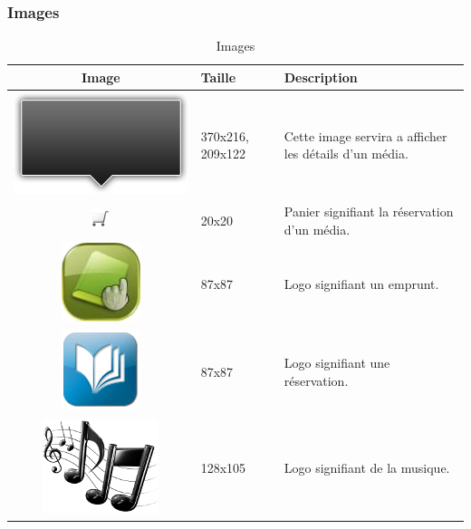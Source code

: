 \documentclass[letter, 11pt]{report}
\begin{document}
\subsubsection{Images}

\begin{table}[ht]
	\caption{Images}
	\begin{center}
		\begin{tabular}{|c|l|l|}
		\hline
		Image                                            & Taille           & Description \\ \hline
		\includegraphics[scale=0.2]{black_arrow_big.png} & 370x216, 209x122 & Cette image servira a afficher les détails d'un média. \\ \hline
		\includegraphics{cart.png}                       & 20x20            & Panier signifiant la réservation d'un média. \\ \hline
		\includegraphics[scale=1.15]{emprunt.png}        & 87x87            & Logo signifiant un emprunt. \\ \hline
		\includegraphics[scale=0.3]{reservation.png}     & 87x87            & Logo signifiant une réservation. \\ \hline
		\includegraphics[scale=0.3]{musique.png}         & 128x105          & Logo signifiant de la musique. \\ \hline

\end{tabular}
\end{center}
\end{table}
\end{document}
